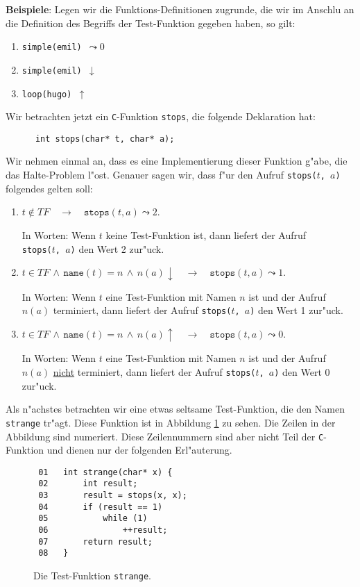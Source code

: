 \noindent
\textbf{Beispiele}: Legen wir die Funktions-Definitionen zugrunde, die wir im Anschlu\3 an
die Definition des Begriffs der Test-Funktion gegeben haben, so gilt:
\begin{enumerate}
\item {\tt simple(emil) $\leadsto 0$}
\item {\tt simple(emil) $\downarrow$}
\item {\tt loop(hugo) $\uparrow$}
\end{enumerate}

\noindent
Wir betrachten jetzt ein \texttt{C}-Funktion \texttt{stops}, die folgende Deklaration
hat:
\begin{verbatim}
      int stops(char* t, char* a);
\end{verbatim}
Wir nehmen einmal an, dass es eine Implementierung dieser Funktion g"abe, die das Halte-Problem l"ost.  Genauer sagen wir, dass
f"ur den Aufruf \texttt{stops($t$, $a$)} folgendes gelten soll:
\begin{enumerate}
\item $t \not\in T\!F \quad\rightarrow\quad \mathtt{stops}(t, a) \leadsto 2$.

      In Worten: Wenn $t$ keine Test-Funktion ist, dann liefert der Aufruf \\
      \texttt{stops($t$, $a$)} den Wert 2 zur"uck.
\item $t \in T\!F \,\wedge\, \mathtt{name}(t) = n \,\wedge\, n(a)\downarrow \quad\rightarrow\quad
       \mathtt{stops}(t, a) \leadsto 1$.

      In Worten: Wenn $t$ eine Test-Funktion mit Namen $n$ ist und der Aufruf $n(a)$ terminiert,
      dann liefert der Aufruf \texttt{stops($t$, $a$)} den Wert 1 zur"uck.
\item $t \in T\!F \,\wedge\, \mathtt{name}(t) = n \,\wedge\, n(a)\uparrow \quad\rightarrow\quad
       \mathtt{stops}(t, a) \leadsto 0$.

      In Worten: Wenn $t$ eine Test-Funktion mit Namen $n$ ist und der Aufruf $n(a)$ \underline{nicht} terminiert,
      dann liefert der Aufruf \texttt{stops($t$, $a$)} den Wert 0 zur"uck. 
\end{enumerate}

Als n"achstes betrachten wir eine etwas seltsame Test-Funktion, die den Namen
\texttt{strange} tr"agt. Diese Funktion ist in Abbildung \ref{fig:strange} zu sehen.
Die Zeilen in der Abbildung sind numeriert.  Diese Zeilennummern sind aber nicht Teil der
\texttt{C}-Funktion und dienen nur der folgenden Erl"auterung.
\begin{figure}[!h]
\begin{verbatim}
 01   int strange(char* x) {
 02       int result;
 03       result = stops(x, x);
 04       if (result == 1) 
 05           while (1) 
 06               ++result;
 07       return result;
 08   }
\end{verbatim}
  \caption{Die Test-Funktion \texttt{strange}.}
  \label{fig:strange}
\end{figure}

